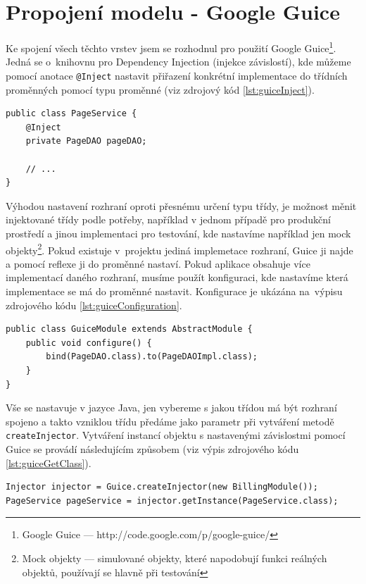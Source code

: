 \section{Propojení modelu - Google Guice}
Ke spojení všech těchto vrstev jsem se rozhodnul pro použití Google Guice\footnote{Google Guice --- http://code.google.com/p/google-guice/}. Jedná se o~knihovnu pro Dependency Injection (injekce závislostí), kde můžeme pomocí anotace \verb|@Inject| nastavit přiřazení konkrétní implementace do třídních proměnných pomocí typu proměnné (viz zdrojový kód \ref{lst:guiceInject}).

\begin{lstlisting}[caption={Ukázka použití Google Guice za pomocí anotace @Inject},label=lst:guiceInject,belowcaptionskip=0.4cm]
public class PageService {
	@Inject
	private PageDAO pageDAO;

	// ...
}
\end{lstlisting}

Výhodou nastavení rozhraní oproti přesnému určení typu třídy, je možnost měnit injektované třídy podle potřeby, například v jednom případě pro produkční prostředí a jinou implementaci pro testování, kde nastavíme například jen mock objekty\footnote{Mock objekty --- simulované objekty, které napodobují funkci reálných objektů, používají se hlavně při testování}. Pokud existuje v~projektu jediná implemetace rozhraní, Guice ji najde a pomocí reflexe ji do proměnné nastaví. Pokud aplikace obsahuje více implementací daného rozhraní, musíme použít konfiguraci, kde nastavíme která implementace se má do proměnné nastavit. Konfigurace je ukázána na~výpisu zdrojového kódu \ref{lst:guiceConfiguration}.

\begin{lstlisting}[caption={Příklad konfigurace Google Guice},label=lst:guiceConfiguration,belowcaptionskip=0.4cm]
public class GuiceModule extends AbstractModule {
	public void configure() {
		bind(PageDAO.class).to(PageDAOImpl.class);
	}
}
\end{lstlisting}

Vše se nastavuje v jazyce Java, jen vybereme s jakou třídou má být rozhraní spojeno a takto vzniklou třídu předáme jako parametr při vytváření metodě \verb|createInjector|. Vytváření instancí objektu s nastavenými závislostmi pomocí Guice se provádí následujícím způsobem (viz výpis zdrojového kódu \ref{lst:guiceGetClass}).

\begin{lstlisting}[caption={Získávání sestavených tříd pomocí Google Guice},label=lst:guiceGetClass,belowcaptionskip=0.4cm]
Injector injector = Guice.createInjector(new BillingModule());
PageService pageService = injector.getInstance(PageService.class);
\end{lstlisting}

